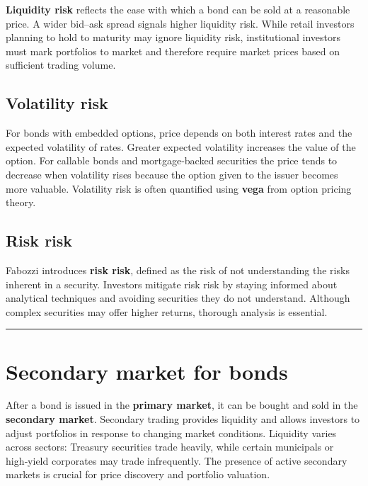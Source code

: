 \documentclass[
  letterpaper,
  DIV=11,
  numbers=noendperiod]{scrartcl}
\begin{document}
\textbf{Liquidity risk} reflects the ease with which a bond can be sold
at a reasonable price. A wider bid--ask spread signals higher liquidity
risk. While retail investors planning to hold to maturity may ignore
liquidity risk, institutional investors must mark portfolios to market
and therefore require market prices based on sufficient trading volume.

\subsection{Volatility risk}\label{volatility-risk}

For bonds with embedded options, price depends on both interest rates
and the expected volatility of rates. Greater expected volatility
increases the value of the option. For callable bonds and
mortgage‑backed securities the price tends to decrease when volatility
rises because the option given to the issuer becomes more valuable.
Volatility risk is often quantified using \textbf{vega} from option
pricing theory.

\subsection{Risk risk}\label{risk-risk}

Fabozzi introduces \textbf{risk risk}, defined as the risk of not
understanding the risks inherent in a security. Investors mitigate risk
risk by staying informed about analytical techniques and avoiding
securities they do not understand. Although complex securities may offer
higher returns, thorough analysis is essential.

\begin{center}\rule{0.5\linewidth}{0.5pt}\end{center}

\section{Secondary market for bonds}\label{secondary-market-for-bonds}

After a bond is issued in the \textbf{primary market}, it can be bought
and sold in the \textbf{secondary market}. Secondary trading provides
liquidity and allows investors to adjust portfolios in response to
changing market conditions. Liquidity varies across sectors: Treasury
securities trade heavily, while certain municipals or high‑yield
corporates may trade infrequently. The presence of active secondary
markets is crucial for price discovery and portfolio valuation.
\end{document}
